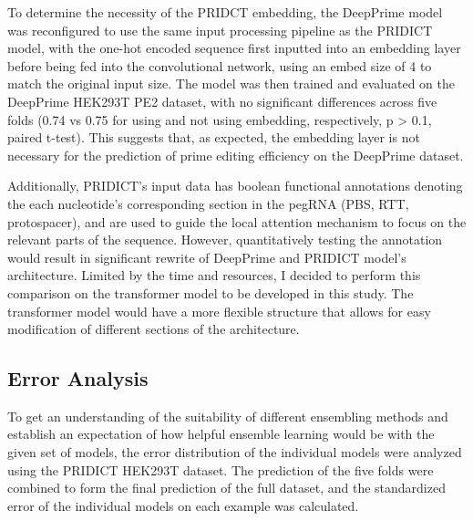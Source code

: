 To determine the necessity of the PRIDCT embedding, the DeepPrime model was reconfigured to use the same input processing pipeline as the PRIDICT model, with the one-hot encoded sequence first inputted into an embedding layer before being fed into the convolutional network, using an embed size of 4 to match the original input size. The model was then trained and evaluated on the DeepPrime HEK293T PE2 dataset, with no significant differences across five folds (0.74 vs 0.75 for using and not using embedding, respectively, p > 0.1, paired t-test). This suggests that, as expected, the embedding layer is not necessary for the prediction of prime editing efficiency on the DeepPrime dataset.

Additionally, PRIDICT's input data has boolean functional annotations denoting the each nucleotide's corresponding section in the pegRNA (PBS, RTT, protospacer), and are used to guide the local attention mechanism to focus on the relevant parts of the sequence. However, quantitatively testing the annotation would result in significant rewrite of DeepPrime and PRIDICT model's architecture. Limited by the time and resources, I decided to perform this comparison on the transformer model to be developed in this study. The transformer model would have a more flexible structure that allows for easy modification of different sections of the architecture. 

\subsection{Error Analysis}

To get an understanding of the suitability of different ensembling methods and establish an expectation of how helpful ensemble learning would be with the given set of models, the error distribution of the individual models were analyzed using the PRIDICT HEK293T dataset. The prediction of the five folds were combined to form the final prediction of the full dataset, and the standardized error of the individual models on each example was calculated.

